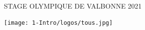 
\begin{center}\LARGE{\textsc{STAGE OLYMPIQUE DE VALBONNE 2021}}
\vrule depth 0pt height 0.4pt width 16cm\end{center}





\vspace{2cm}


\begin{center}
\texttt{[image: 1-Intro/logos/tous.jpg]}
\end{center}






